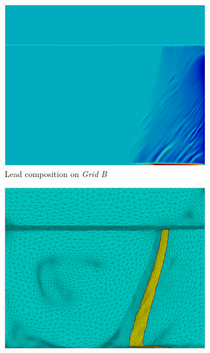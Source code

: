 \begin{figure}[htbp]
\begin{subfigure}[t]{0.15\textwidth}
  \end{subfigure}
  \begin{subfigure}[t]{0.4\textwidth}
    \centering
  \includegraphics[width=\textwidth]{Chapter5/Graphics/2d/1200s_compobis.png}
  \caption{Lead composition on \emph{Grid B}}
    \label{fig:1200s_compobis}
  \end{subfigure}
   \vspace{5mm}
  \begin{subfigure}[t]{0.4\textwidth}
    \centering
  \includegraphics[width=\textwidth]{Chapter5/Graphics/2d/1200s_unmask.png}

\end{subfigure}
\end{figure}
